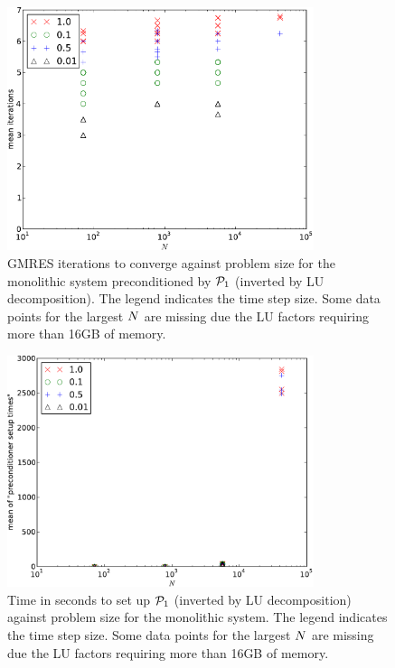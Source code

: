 \begin{figure}
  \centering
  \includegraphics[width=0.8\textwidth]{plots/linear_solvers/som-main-exactimplicitdummy-meanofnsolveritersvsinitialnnode.pdf}
  \caption{GMRES iterations to converge against problem size for the monolithic system preconditioned by $\mathcal{P}_1$ (inverted by LU decomposition).
The legend indicates the time step size.
Some data points for the largest $N$ are missing due the LU factors requiring more than 16GB of memory.
}
  \label{fig:its-p1-exact}
\end{figure}


\begin{figure}
  \centering
  \includegraphics[width=0.8\textwidth]{plots/linear_solvers/som-main-exactimplicitdummy-meanofpreconditionersetuptimesvsinitialnnode.pdf}
  \caption{Time in seconds to set up $\mathcal{P}_1$ (inverted by LU decomposition) against problem size for the monolithic system.
    The legend indicates the time step size.
    Some data points for the largest $N$ are missing due the LU factors requiring more than 16GB of memory.
}
  \label{fig:times-p1-exact}
\end{figure}


